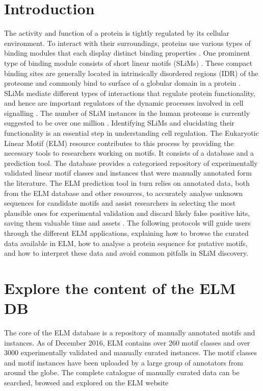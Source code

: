 \documentclass[12pt]{article}
\newcounter{proto}
\begin{document}
\section*{Introduction}%
\label{sec:introduction}

The activity and function of a protein is tightly regulated by its
cellular environment. To interact with their surroundings, proteins use
various types of binding modules that each display distinct binding
properties \citep{10550212}. One prominent type of binding module
consists of short linear motifs (SLiMs) \citep{18508681}. These compact
binding sites are generally located in intrinsically disordered regions
(IDR) of the proteome and commonly bind to
surface of a globular domain in a protein \citep{21909575}. SLiMs mediate
different types of interactions that regulate protein functionality, and hence
are important regulators of the dynamic processes involved in cell
signalling \citep{22480932} \citep{24926813}. The number of
SLiM instances in the human proteome is currently suggested to be over
one million \citep{25038412}. Identifying SLiMs and elucidating their
functionality is an essential step in understanding cell regulation. The
Eukaryotic Linear Motif (ELM) resource contributes to this process by
providing the necessary tools to researchers working on motifs. It
consists of a database and a prediction tool. The database provides a
categorised repository of experimentally validated linear motif classes
and instances that were manually annotated form the literature. The ELM
prediction tool in turn relies on annotated data, both from the ELM
database and other resources, to accurately analyse unknown sequences
for candidate motifs and assist researchers in selecting the most
plausible ones for experimental validation and discard likely false
positive hits, saving them valuable time and assets \citep{22110040}.
The following protocols will guide users through the different ELM
applications, explaining how to browse the curated data available in
ELM, how to analyse a protein sequence for putative motifs, and how to
interpret these data and avoid common pitfalls in SLiM discovery.


\section{Explore the content of the ELM DB}%
\label{sec:explore_content}

The core of the ELM database is a repository of manually annotated motifs and
instances. As of December 2016, ELM contains over 260 motif classes and over
3000 experimentally validated and manually curated instances.
The motif classes and motif instances have been uploaded by a large group of
annotators from around the globe. The complete catalogue of manually curated
data can be searched, browsed and explored on the ELM website
\end{document}
